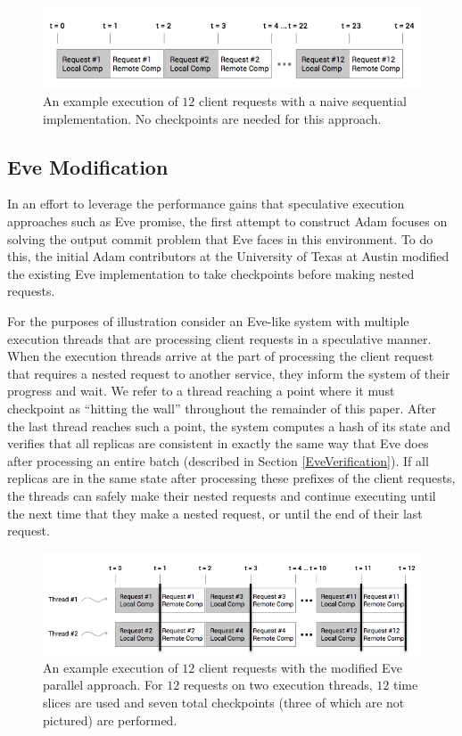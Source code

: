 \documentclass[11pt, oneside]{report}
\begin{document}
\begin{figure}[h]
\centering
\includegraphics[width=1.0\textwidth]{NaiveSequential.png}
\caption{\label{NaiveSequential}An example execution of $12$ client requests with a naive sequential implementation. No checkpoints are needed for this approach.}
\end{figure}

\subsection{Eve Modification}\label{EveModification}

In an effort to leverage the performance gains that speculative execution approaches such as Eve promise, the first attempt to construct Adam focuses on solving the output commit problem that Eve faces in this environment. 
To do this, the initial Adam contributors at the University of Texas at Austin modified the existing Eve implementation to take checkpoints before making nested requests. 

For the purposes of illustration consider an Eve-like system with multiple execution threads that are processing client requests in a speculative manner. 
When the execution threads arrive at the part of processing the client request that requires a nested request to another service, they inform the system of their progress and wait.
We refer to a thread reaching a point where it must checkpoint as ``hitting the wall'' throughout the remainder of this paper.
After the last thread reaches such a point, the system computes a hash of its state and verifies that all replicas are consistent in exactly the same way that Eve does after processing an entire batch (described in Section \ref{EveVerification}). 
If all replicas are in the same state after processing these prefixes of the client requests, the threads can safely make their nested requests and continue executing until the next time that they make a nested request, or until the end of their last request.

\begin{figure}[h]
\centering
\includegraphics[width=1.0\textwidth]{Parallel.png}
\caption{\label{parallel}An example execution of $12$ client requests with the modified Eve parallel approach. For $12$ requests on two execution threads, $12$ time slices are used and seven total checkpoints (three of which are not pictured) are performed.}
\end{figure}
\end{document}
